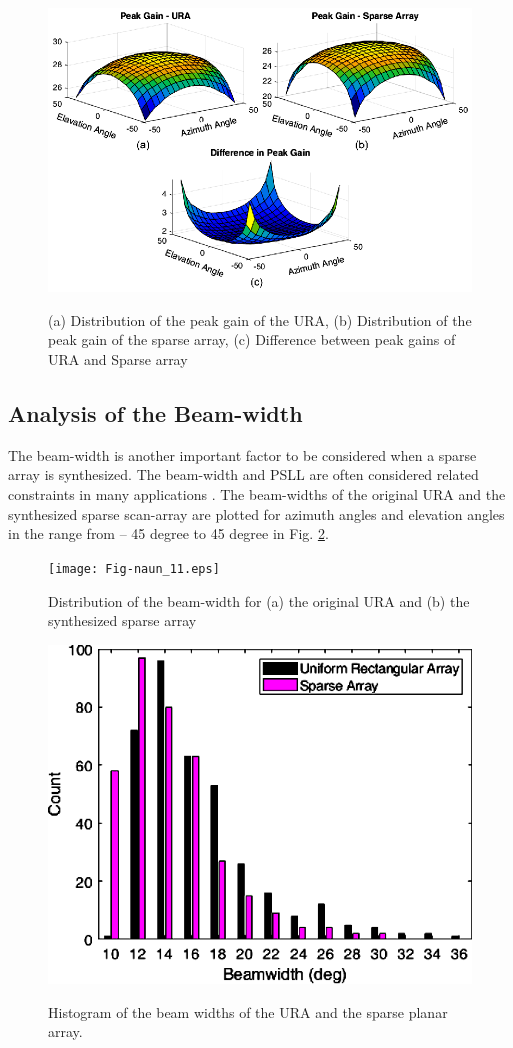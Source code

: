 \begin{figure}
  \centering
  \includegraphics[width=0.95\linewidth]{Fig-naun_10.eps}\\
  \caption{(a) Distribution of the peak gain of the URA, (b) Distribution of the peak gain of the sparse array, (c) Difference between peak gains of URA and Sparse array} \label{fig_5_10}
\end{figure}

\subsection{Analysis of the Beam-width}
The beam-width is another important factor to be considered when a sparse array is synthesized. The beam-width and PSLL are often considered related constraints in many applications \cite{arrayTradeoffs}. The beam-widths of the original URA and the synthesized sparse scan-array are plotted for azimuth angles and elevation angles in the range from -- 45 degree to 45 degree in Fig. \ref{fig_5_11}.

\begin{figure}
  \centering
  \texttt{[image: Fig-naun\_11.eps]}\\
  \caption{Distribution of the beam-width for (a) the original URA and (b) the synthesized sparse array} \label{fig_5_11}
\end{figure}

\begin{figure}
  \centering
  \includegraphics[width=0.5\linewidth]{Fig-naun_12.eps}\\
  \caption{Histogram of the beam widths of the URA and the sparse planar array.} \label{fig_5_12}
\end{figure}

